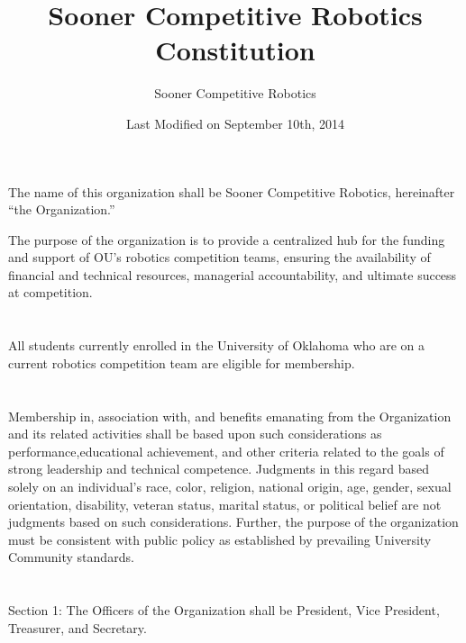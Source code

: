 \documentclass[12pt]{cls/constitution}
\begin{document}
\title{Sooner Competitive Robotics Constitution}
\author{Sooner Competitive Robotics}
\date{Last Modified on September 10th, 2014}
\maketitle
\setcounter{tocdepth}{0}
\tableofcontents
\newpage


The name of this organization shall be Sooner Competitive Robotics,  hereinafter “the Organization.”


The purpose of the organization is to provide a centralized hub for the funding and support of OU's robotics competition teams, ensuring the availability of financial and technical resources, managerial accountability, and ultimate success at competition. 


\section{}
All students currently enrolled in the University of Oklahoma who are on a current robotics competition team are eligible for membership. 

\section{}
Membership in, association with, and benefits emanating from the Organization and its related activities shall be based upon such considerations as performance,educational achievement, and other criteria related to the goals of strong leadership and technical competence. Judgments in this regard based solely on an individual’s race, color, religion, national origin, age, gender, sexual orientation, disability, veteran status, marital status, or political belief are not judgments based on such considerations. Further, the purpose of the organization must be consistent with public policy as established by prevailing University Community standards.  


\section{}
Section 1: The Officers of the Organization shall be President, Vice President, Treasurer, and Secretary.
\end{document}
